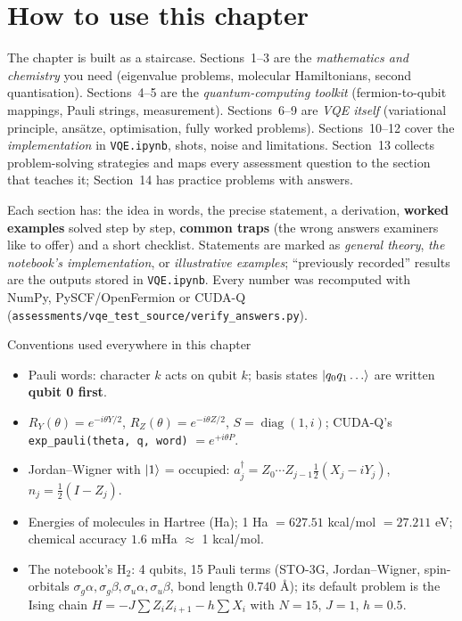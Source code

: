 \documentclass[11pt,a4paper,openany]{book}
\begin{document}
\section*{How to use this chapter}
The chapter is built as a staircase. Sections~1--3 are the \emph{mathematics and chemistry} you need (eigenvalue problems,
molecular Hamiltonians, second quantisation). Sections~4--5 are the \emph{quantum-computing toolkit} (fermion-to-qubit mappings,
Pauli strings, measurement). Sections~6--9 are \emph{VQE itself} (variational principle, ansätze, optimisation, fully worked
problems). Sections~10--12 cover the \emph{implementation} in \texttt{VQE.ipynb}, shots, noise and limitations. Section~13 collects
problem-solving strategies and maps every assessment question to the section that teaches it; Section~14 has practice problems
with answers.

Each section has: the idea in words, the precise statement, a derivation, \textbf{worked examples} solved step by step,
\textbf{common traps} (the wrong answers examiners like to offer) and a short checklist. Statements are marked as \emph{general
theory}, \emph{the notebook's implementation}, or \emph{illustrative examples}; ``previously recorded'' results are the outputs stored
in \texttt{VQE.ipynb}. Every number was recomputed with NumPy, PySCF/OpenFermion or CUDA-Q (\texttt{assessments/vqe\_test\_source/verify\_answers.py}).

\begin{defn}{Conventions used everywhere in this chapter}
\begin{itemize}[leftmargin=1.2em, itemsep=1pt]
\item Pauli words: character $k$ acts on qubit $k$; basis states $\ket{q_0q_1\dots}$ are written \textbf{qubit 0 first}.
\item $R_Y(\theta) = e^{-i\theta Y/2}$, $R_Z(\theta) = e^{-i\theta Z/2}$, $S = \operatorname{diag}(1, i)$; CUDA-Q's \texttt{exp\_pauli(theta, q, word)} $= e^{+i\theta P}$.
\item Jordan--Wigner with $\ket1$ = occupied: $a_j^\dagger = Z_0\cdots Z_{j-1}\tfrac12(X_j - iY_j)$, $n_j = \tfrac12(I - Z_j)$.
\item Energies of molecules in Hartree (Ha); 1 Ha $= 627.51$ kcal/mol $= 27.211$ eV; chemical accuracy $1.6$ mHa $\approx$ 1 kcal/mol.
\item The notebook's H$_2$: 4 qubits, 15 Pauli terms (STO-3G, Jordan--Wigner, spin-orbitals $\sigma_g\alpha, \sigma_g\beta, \sigma_u\alpha, \sigma_u\beta$,
      bond length $0.740$ \AA); its default problem is the Ising chain $H = -J\sum Z_iZ_{i+1} - h\sum X_i$ with $N = 15$, $J = 1$, $h = 0.5$.
\end{itemize}
\end{defn}
\end{document}
